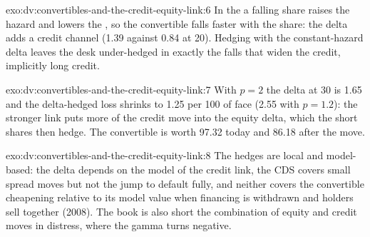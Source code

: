 \begin{solution}{exo:dv:convertibles-and-the-credit-equity-link:6}
In the  a falling share raises the hazard and lowers the , so the convertible falls faster with the share: the
delta adds a credit channel (1.39 against 0.84 at 20). Hedging with the constant-hazard delta leaves the desk under-hedged in exactly the falls
that widen the credit, implicitly long credit.
\end{solution}

\begin{solution}{exo:dv:convertibles-and-the-credit-equity-link:7}
With $p=2$ the delta at 30 is 1.65 and the delta-hedged loss shrinks to 1.25 per 100 of face (2.55 with $p=1.2$): the stronger link puts more of
the credit move into the equity delta, which the short shares then hedge. The convertible is worth 97.32 today and 86.18 after the move.
\end{solution}

\begin{solution}{exo:dv:convertibles-and-the-credit-equity-link:8}
The hedges are local and model-based: the delta depends on the model of the credit link, the CDS covers small spread moves but not the jump to
default fully, and neither covers the convertible cheapening relative to its model value when financing is withdrawn and holders sell together (2008).
The book is also short the combination of equity and credit moves in distress, where the gamma turns negative.
\end{solution}

